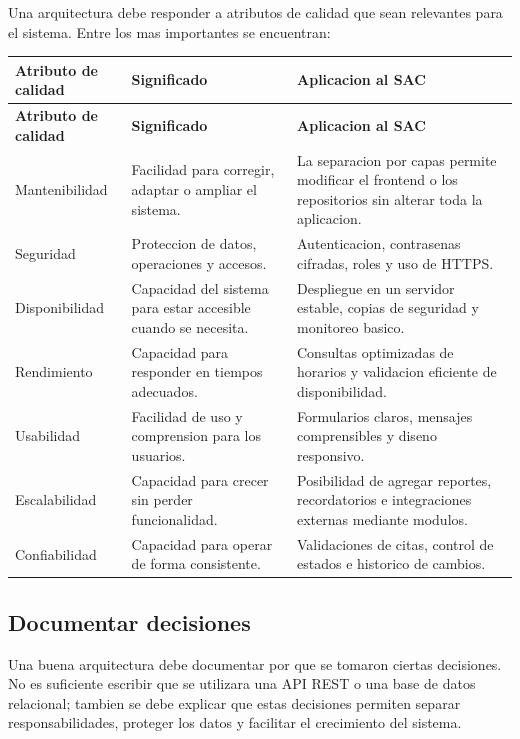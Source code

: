 \documentclass[12pt,letterpaper]{article}
\begin{document}
Una arquitectura debe responder a atributos de calidad que sean relevantes para el sistema. Entre los mas importantes se encuentran:

\begin{longtable}{|p{3.5cm}|p{5cm}|p{6.1cm}|}
\hline
\textbf{Atributo de calidad} & \textbf{Significado} & \textbf{Aplicacion al SAC} \\
\hline
\endfirsthead
\hline
\textbf{Atributo de calidad} & \textbf{Significado} & \textbf{Aplicacion al SAC} \\
\hline
\endhead
\hline
\endfoot
\hline
\endlastfoot

Mantenibilidad & Facilidad para corregir, adaptar o ampliar el sistema. & La separacion por capas permite modificar el frontend o los repositorios sin alterar toda la aplicacion. \\
\hline

Seguridad & Proteccion de datos, operaciones y accesos. & Autenticacion, contrasenas cifradas, roles y uso de HTTPS. \\
\hline

Disponibilidad & Capacidad del sistema para estar accesible cuando se necesita. & Despliegue en un servidor estable, copias de seguridad y monitoreo basico. \\
\hline

Rendimiento & Capacidad para responder en tiempos adecuados. & Consultas optimizadas de horarios y validacion eficiente de disponibilidad. \\
\hline

Usabilidad & Facilidad de uso y comprension para los usuarios. & Formularios claros, mensajes comprensibles y diseno responsivo. \\
\hline

Escalabilidad & Capacidad para crecer sin perder funcionalidad. & Posibilidad de agregar reportes, recordatorios e integraciones externas mediante modulos. \\
\hline

Confiabilidad & Capacidad para operar de forma consistente. & Validaciones de citas, control de estados e historico de cambios. \\
\hline
\end{longtable}

\subsection{Documentar decisiones}

Una buena arquitectura debe documentar por que se tomaron ciertas decisiones. No es suficiente escribir que se utilizara una API REST o una base de datos relacional; tambien se debe explicar que estas decisiones permiten separar responsabilidades, proteger los datos y facilitar el crecimiento del sistema.
\end{document}
